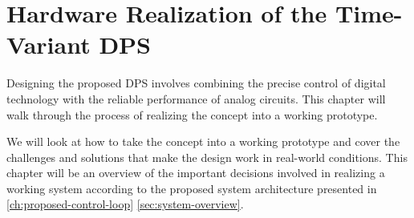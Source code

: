 
\chapter[Hardware Realization of the Time-Variant DPS]{Hardware Realization of the Time-Variant \acs{DPS}}
\label{ch:hardware-realization}


Designing the proposed \acs{DPS} involves combining the precise control of
digital technology with the reliable performance of analog circuits.
This chapter will walk through the process of realizing the concept into
a working prototype.

We will look at how to take the concept into a working prototype and cover the
challenges and solutions that make the design work in real-world conditions.
This chapter will be an overview of the important decisions involved in
realizing a working system according to the proposed system architecture
presented in \autoref{ch:proposed-control-loop} \autoref{sec:system-overview}.






